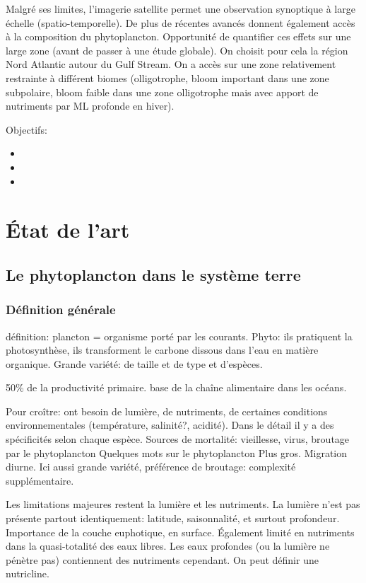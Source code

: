 \documentclass[master]{subfiles}
\begin{document}
Malgré ses limites, l'imagerie satellite permet une observation synoptique à large échelle (spatio-temporelle).
De plus de récentes avancés donnent également accès à la composition du phytoplancton.
Opportunité de quantifier ces effets sur une large zone (avant de passer à une étude globale).
On choisit pour cela la région Nord Atlantic autour du Gulf Stream. On a accès sur une zone relativement restrainte à différent biomes (olligotrophe, bloom important dans une zone subpolaire, bloom faible dans une zone olligotrophe mais avec apport de nutriments par ML profonde en hiver).

Objectifs:
\begin{itemize}
  \item
  \item
  \item
\end{itemize}


\section{État de l'art}
\label{sec:etat-de-lart}

\subsection{Le phytoplancton dans le système terre}
\label{sec:phyto-ds-sys-terre}

\subsubsection{Définition générale}
\label{sec:phyto-def-gen}

définition: plancton = organisme porté par les courants.
Phyto: ils pratiquent la photosynthèse, ils transforment le carbone dissous dans l'eau en matière organique.
Grande variété: de taille et de type et d'espèces.

50\% de la productivité primaire.
base de la chaîne alimentaire dans les océans.

Pour croître: ont besoin de lumière, de nutriments, de certaines conditions environnementales (température, salinité?, acidité). Dans le détail il y a des spécificités selon chaque espèce.
Sources de mortalité: vieillesse, virus, broutage par le phytoplancton
Quelques mots sur le phytoplancton Plus gros. Migration diurne. Ici aussi grande variété, préférence de broutage: complexité supplémentaire.

Les limitations majeures restent la lumière et les nutriments.
La lumière n'est pas présente partout identiquement: latitude, saisonnalité, et surtout profondeur. Importance de la couche euphotique, en surface.
Également limité en nutriments dans la quasi-totalité des eaux libres. Les eaux profondes (ou la lumière ne pénètre pas) contiennent des nutriments cependant. On peut définir une nutricline.
\end{document}
